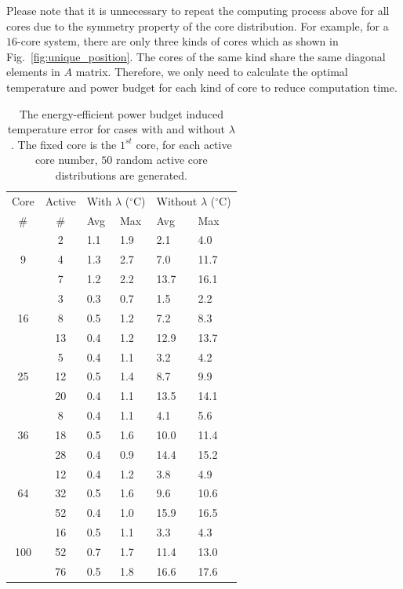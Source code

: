 Please note that it is unnecessary to repeat the computing process
above for all cores due to the symmetry property of the core
distribution. For example, for a $16$-core system, there are only
three kinds of cores which as shown in
Fig.~\ref{fig:unique_position}. The cores of the same kind share the
same diagonal elements in $A$ matrix. Therefore, we only need to
calculate the optimal temperature and power budget for each kind of
core to reduce computation time.

\begin{table}
  \caption{The energy-efficient power budget induced temperature error for cases with and without $\lambda$. The fixed core is the $1^{st}$ core, for each active core number, $50$ random active core distributions are generated.}
  \label{tab:compensation}
  \centering
  \begin{tabular}{c|c||p{1cm}<{\centering}|p{1cm}<{\centering}||p{1cm}<{\centering}|p{1cm}<{\centering}}
    \hline
    Core & Active     & \multicolumn{2}{c||}{With $\lambda$ ($^{\circ}$C)}  & \multicolumn{2}{c}{Without $\lambda$ ($^{\circ}$C)}\\
\cline{3-6}
    \#       &   \#       &  Avg    & Max &  Avg  &  Max  \\
     \hline
\hline
  \multirow{3}{*}{9} &      2       &   1.1  &   1.9 &2.1&4.0\\
             &      4       &    1.3    &   2.7  &7.0&11.7 \\
             &      7       &   1.2     &   2.2   &13.7&16.1\\
     \hline
   \multirow{3}{*}{16} &      3        &   0.3 &   0.7   &1.5 &2.2 \\   
             &      8       &    0.5     &  1.2  &7.2 &8.3   \\
             &      13     &     0.4    &   1.2  &12.9 &13.7 \\
     \hline
  \multirow{3}{*}{25} &      5       &    0.4 & 1.1 & 3.2 &  4.2   \\ 
              &     12      &    0.5     &    1.4   &  8.7 & 9.9 \\
              &     20      &    0.4     &    1.1   & 13.5 & 14.1 \\ 
     \hline
  \multirow{3}{*}{36}  &     8        &    0.4  &    1.1 & 4.1 & 5.6\\
              &     18      &   0.5      &   1.6  & 10.0 & 11.4  \\
              &     28      &    0.4     &   0.9 & 14.4 & 15.2\\
     \hline
  \multirow{3}{*}{64}  &     12      &   0.4  &   1.2  & 3.8 &4.9 \\
              &     32      &    0.5     &     1.6   & 9.6 & 10.6   \\
              &     52      &     0.4   &     1.0   & 15.9 & 16.5\\
 \hline 
\multirow{3}{*}{100}  & 16 & 	 0.5&	1.1& 3.3 &  4.3\\
                      & 52 &	 0.7&	1.7& 11.4 & 13.0\\
                      & 76 &	 0.5&	1.8& 16.6 & 17.6\\
\hline
\end{tabular}
\end{table}


